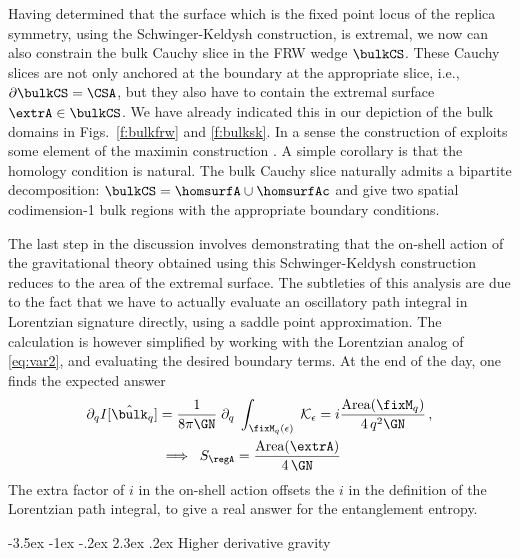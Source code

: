 \documentclass[12pt,openany]{book}
\makeatletter
\renewcommand\section{\@startsection {section}{1}{\z@}%
                                   {-3.5ex \@plus -1ex \@minus -.2ex}%
                                   {2.3ex \@plus.2ex}%
                                   {\normalfont\large\bfseries}}
\makeatother
\begin{document}
Having determined that the surface which is the fixed point locus of the replica symmetry, using the Schwinger-Keldysh construction, is extremal, we now can also constrain the bulk Cauchy slice in the FRW wedge $\bulkCS $. These Cauchy slices are not only  anchored at the boundary at the appropriate slice, i.e., $\partial \bulkCS = \CSA$, but they also have to contain the extremal surface $\extrA \in \bulkCS$.   We have already indicated this in our depiction of the bulk domains in Figs.~\ref{f:bulkfrw} and  \ref{f:bulksk}. In a sense the construction of \cite{Dong:2016hjy} exploits some element of the maximin construction \cite{Wall:2012uf}.  A simple corollary is that the  homology condition is natural. The bulk Cauchy slice naturally admits a bipartite decomposition: $\bulkCS  = \homsurfA \cup \homsurfAc$ and give two spatial codimension-1 bulk regions with the appropriate boundary conditions.

The last step in the discussion involves demonstrating that the on-shell action of the gravitational theory obtained using this Schwinger-Keldysh construction reduces to the area of the extremal surface. The subtleties of this analysis are due to the fact that we have to actually evaluate an oscillatory path integral in Lorentzian signature directly, using a saddle point approximation. The calculation is however simplified by working with the Lorentzian analog of \eqref{eq:var2}, and evaluating the desired boundary terms. At the end of the day, one finds the expected answer
%
\begin{equation}
\begin{split}
\partial_q I[\hat{\bulk}_q]&= \frac{1}{8 \pi \GN} \; \partial_q \; \int_{\fixM_q(\epsilon)} \; {\cal K}_\epsilon = i \frac{\text{Area}(\fixM_q)}{4\, q^2 \GN} \,,  \\
&\;\Longrightarrow\;\;
S_\regA = \frac{\text{Area}(\extrA)}{4\,\GN}
\end{split}
\end{equation}
%
The extra factor of $i$ in the on-shell action offsets the $i$ in the definition of the Lorentzian path integral, to give a real answer for the entanglement entropy.

\section{Higher derivative gravity}
\label{sec:hdgr}
\end{document}
